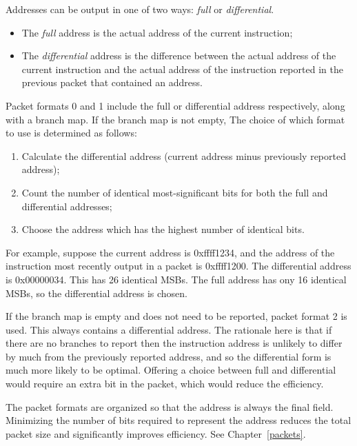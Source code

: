 Addresses can be output in one of two ways: \textit{full} or \textit{differential}.

\begin{itemize}
  \item The \textit{full} address is the actual address of the current instruction;
  \item The \textit{differential} address is the difference between the actual address of 
    the current instruction and the actual address of the instruction reported in the 
    previous packet that contained an address.
\end{itemize}

Packet formats 0 and 1 include the full or differential address respectively, along with a 
branch map.  If the branch map is not empty, The choice of which format to use is determined as follows:

\begin{enumerate}
  \item Calculate the differential address (current address minus previously reported address);
  \item Count the number of identical most-significant bits for both the full and 
    differential addresses;
  \item Choose the address which has the highest number of identical bits.
\end{enumerate}

For example, suppose the current address is 0xffff1234, and the address of the instruction most
recently output in a packet is 0xffff1200.  The differential address is 0x00000034.  This has 
26 identical MSBs.  The full address has ony 16 identical MSBs, so the differential address is
chosen.

If the branch map is empty and does not need to be reported, packet format 2 is used.  This
always contains a differential address.  The rationale here is that if there are no branches to 
report then the instruction address is unlikely to differ by much from the previously reported
address, and so the differential form is much more likely to be optimal.  Offering a choice
between full and differential would require an extra bit in the packet, which would reduce the
efficiency.  

The packet formats are organized so that the address is always the final field.  Minimizing the 
number of bits required to represent the address reduces the total packet size and significantly
improves efficiency.  See Chapter~\ref{packets}.
